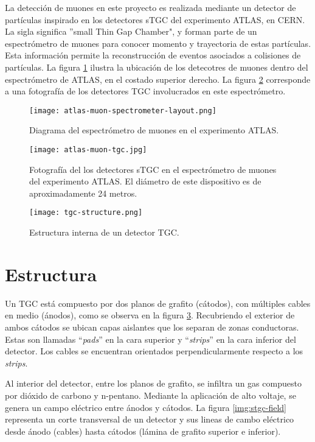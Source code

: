 
La detección de muones en este proyecto es realizada mediante un detector de partículas inspirado en los detectores sTGC del experimento ATLAS, en CERN. La sigla significa ''small Thin Gap Chamber", y forman parte de un espectrómetro de muones para conocer momento y trayectoria de estas partículas. Esta información permite la reconstrucción de eventos asociados a colisiones de partículas. La figura \ref{img:atlas-layout} ilustra la ubicación de los detecotres de muones dentro del espectrómetro de ATLAS, en el costado superior derecho. La figura \ref{img:atlas-tgc} corresponde a una fotografía de los detectores TGC involucrados en este espectrómetro.

\begin{figure}[h]
	\centering
	\texttt{[image: atlas-muon-spectrometer-layout.png]}
	\caption{Diagrama del espectrómetro de muones en el experimento ATLAS\cite{AtlasMuonDiagram}.}
	\label{img:atlas-layout}
\end{figure}

\newpage
\begin{figure}[h]
	\centering
	\texttt{[image: atlas-muon-tgc.jpg]}
	\caption{Fotografía del los detectores sTGC en el espectrómetro de muones del experimento ATLAS\cite{AtlasMuonSpect}. El diámetro de este dispositivo es de aproximadamente 24 metros.}
	\label{img:atlas-tgc}
\end{figure}

\begin{figure}[h]
	\centering
	\texttt{[image: tgc-structure.png]}
	\caption{Estructura interna de un detector TGC\cite{Chapman2014}.}
	\label{img:stgc-structure}
\end{figure}

\newpage
\section{Estructura}

	Un TGC está compuesto por dos planos de grafito (cátodos), con múltiples cables en medio (ánodos), como se observa en la figura \ref{img:stgc-structure}. Recubriendo el exterior de ambos cátodos se ubican capas aislantes que los separan de zonas conductoras. Estas son llamadas ``\textit{pads}'' en la cara superior y ``\textit{strips}'' en la cara inferior del detector. Los cables se encuentran orientados perpendicularmente respecto a los \textit{strips}.
	
	Al interior del detector, entre los planos de grafito, se infiltra un gas compuesto por dióxido de carbono y n-pentano. Mediante la aplicación de alto voltaje, se genera un campo eléctrico entre ánodos y cátodos. La figura \ref{img:stgc-field} representa un corte transversal de un detector y sus lineas de cambo eléctrico desde ánodo (cables) hasta cátodos (lámina de grafito superior e inferior).
	
